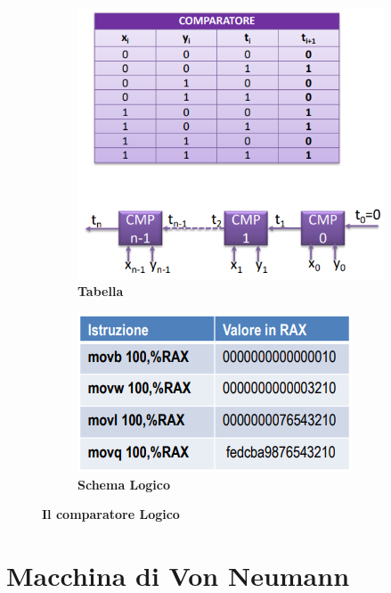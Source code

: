 \documentclass[12pt]{article} %
\begin{document}
\begin{figure}[h]
    \centering
    \begin{subfigure}[b]{0.40\textwidth}
        \centering
        \includegraphics[width=\textwidth]{comparatore.png}
        \caption{\textbf{Tabella}}
    \end{subfigure}
    \hfill %
    \begin{subfigure}[b]{0.45\textwidth}
        \centering
        \includegraphics[width=\textwidth]{image.png}
        \caption{\textbf{Schema Logico}}
    \end{subfigure}
    \caption{\textbf{Il comparatore Logico}}
\end{figure}

\newpage
\section{Macchina di Von Neumann}
\end{document}
